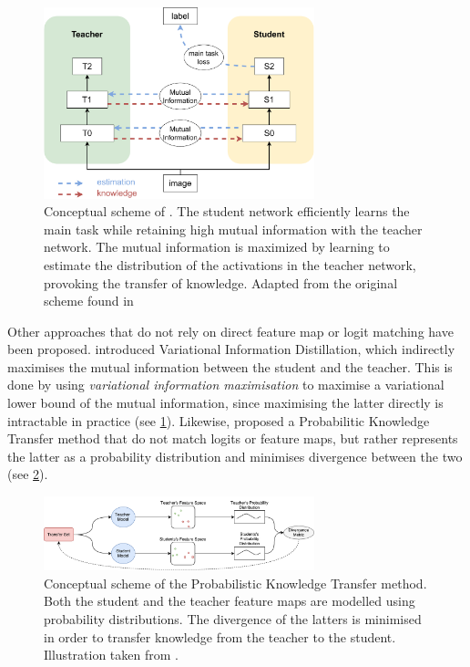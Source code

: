 \begin{figure}[htbp]
    \centering
    \includegraphics[width=0.7\textwidth]{chapter_sota/assets/variational_info_distillation.pdf}
    \caption{Conceptual scheme of \cite{DBLP:conf/cvpr/AhnHDLD19}. The student
    network efficiently learns the main task while retaining high mutual information
    with the teacher network. The mutual information is maximized by learning to
    estimate the distribution of the activations in the teacher network, provoking
    the transfer of knowledge. Adapted from the original
    scheme found in \cite{DBLP:conf/cvpr/AhnHDLD19}}
    \label{fig:sota:vid_scheme}
\end{figure}

Other approaches that do not rely on direct feature map or logit matching have
been proposed. \cite{DBLP:conf/cvpr/AhnHDLD19} introduced Variational
Information Distillation, which indirectly maximises the mutual information
between the student and the teacher. This is done by using \emph{variational
information maximisation} \cite{barber2004algorithm} to maximise a variational
lower bound of the mutual information, since maximising the latter directly is
intractable in practice (see \cref{fig:sota:vid_scheme}). Likewise, \cite{DBLP:conf/eccv/PassalisT18} proposed a
Probabilitic Knowledge Transfer method that do not match logits or feature maps,
but rather represents the latter as a probability distribution and minimises
divergence between the two (see \cref{fig:sota:pkt_scheme}).\\


\begin{figure}[htbp]
    \centering
    \includegraphics[width=0.7\textwidth]{chapter_sota/assets/pkt_diagram.pdf}
    \caption{ Conceptual scheme of the
    Probabilistic Knowledge Transfer method. Both the student and the teacher
    feature maps are modelled using probability distributions. The divergence of the
    latters is minimised in order to transfer knowledge from the teacher to the
    student. Illustration taken from \cite{DBLP:conf/eccv/PassalisT18}.}
    \label{fig:sota:pkt_scheme}
\end{figure}